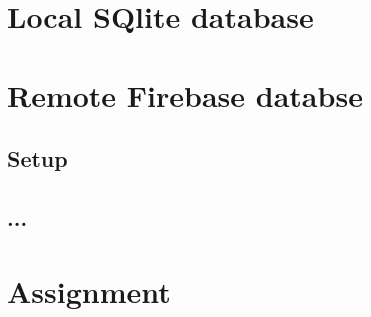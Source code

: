 \section{Local SQlite database}

\begin{comment}
- db.beginTransaction() db.endTransaction() -> group of commands
- db.execSQL(<query>) -> run query that dont return anything like INSERT or DELETE
- db.rawQuery(<query>, <args>) -> run a query that returns somehing like SELECT .. returns a Cursor object
\end{comment}


\section{Remote Firebase databse}
\subsection{Setup}
\subsection{...}

\section{Assignment}
